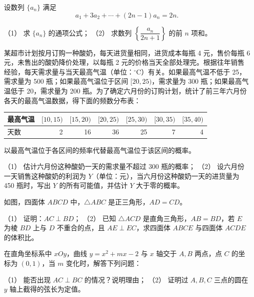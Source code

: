 \begin{question}
设数列 \(\{a_n\}\) 满足
\nopagebreak[4]
\[
a_1+3a_2+\cdots +(2n-1)a_n=2n.
\]

（1） 求 \(\{a_n\}\) 的通项公式；
（2） 求数列 \(\left\{\dfrac{a_n}{2n+1}\right\}\) 的前 \(n\) 项和。

\end{question}
\begin{question}
某超市计划按月订购一种酸奶，每天进货量相同，进货成本每瓶 4 元，售价每瓶 6 元，未售出的酸奶降价处理，以每瓶 2 元的价格当天全部处理完。根据往年销售经验，每天需求量与当天最高气温（单位：\(^\circ\mathrm C\)）有关。如果最高气温不低于 25，需求量为 500 瓶；如果最高气温位于区间 \([20,25)\)，需求量为 300 瓶；如果最高气温低于 20，需求量为 200 瓶。为了确定六月份的订购计划，统计了前三年六月份各天的最高气温数据，得下面的频数分布表：

\begin{center}
\begin{tabular}{lrrrrrr}
\toprule
最高气温 & \([10,15)\) & \([15,20)\) & \([20,25)\) & \([25,30)\) & \([30,35)\) & \([35,40)\) \\
\midrule
天数 & 2 & 16 & 36 & 25 & 7 & 4 \\
\bottomrule
\end{tabular}
\end{center}

以最高气温位于各区间的频率代替最高气温位于该区间的概率。

（1） 估计六月份这种酸奶一天的需求量不超过 300 瓶的概率；
（2） 设六月份一天销售这种酸奶的利润为 \(Y\)（单位：元），当六月份这种酸奶一天的进货量为 450 瓶时，写出 \(Y\) 的所有可能值，并估计 \(Y\) 大于零的概率。

\Needspace{0.4\textheight}
\end{question}
\begin{question}
如图，四面体 \(ABCD\) 中，\(\triangle ABC\) 是正三角形，\(AD=CD\)。
\nopagebreak[4]
\begin{center}\end{center}
\nopagebreak[4]
（1） 证明：\(AC\perp BD\)；
（2） 已知 \(\triangle ACD\) 是直角三角形，\(AB=BD\)，若 \(E\) 为棱 \(BD\) 上与 \(D\) 不重合的点，且 \(AE\perp EC\)，求四面体 \(ABCE\) 与四面体 \(ACDE\) 的体积比。

\end{question}
\begin{question}
在直角坐标系中 \(xOy\)，曲线 \(y=x^2+mx-2\) 与 \(x\) 轴交于 \(A,B\) 两点，点 \(C\) 的坐标为 \((0,1)\)，当 \(m\) 变化时，解答下列问题：

（1） 能否出现 \(AC\perp BC\) 的情况？说明理由；
（2） 证明过 \(A,B,C\) 三点的圆在 \(y\) 轴上截得的弦长为定值。

\end{question}
